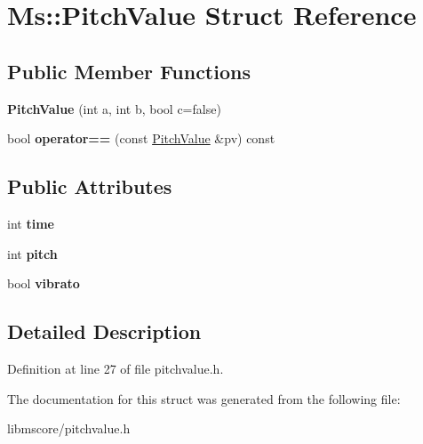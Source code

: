 \hypertarget{struct_ms_1_1_pitch_value}{}\section{Ms\+:\+:Pitch\+Value Struct Reference}
\label{struct_ms_1_1_pitch_value}
\subsection*{Public Member Functions}
\begin{DoxyCompactItemize}
\item 
\mbox{\label{struct_ms_1_1_pitch_value_ab09848a8add064a535915ea1447b5dd5}} 
{\bfseries Pitch\+Value} (int a, int b, bool c=false)
\item 
\mbox{\label{struct_ms_1_1_pitch_value_a43d9f0374b0fd435d8fb27c93ebc4eb7}} 
bool {\bfseries operator==} (const \hyperlink{struct_ms_1_1_pitch_value}{Pitch\+Value} \&pv) const
\end{DoxyCompactItemize}
\subsection*{Public Attributes}
\begin{DoxyCompactItemize}
\item 
\mbox{\label{struct_ms_1_1_pitch_value_add85dc057caf021cc8365b897a53d4be}} 
int {\bfseries time}
\item 
\mbox{\label{struct_ms_1_1_pitch_value_ad258c300e4aabf11d2b65502e6ce8376}} 
int {\bfseries pitch}
\item 
\mbox{\label{struct_ms_1_1_pitch_value_a7fd7bbfbf5c8145f75b2ccc6f34b14f5}} 
bool {\bfseries vibrato}
\end{DoxyCompactItemize}


\subsection{Detailed Description}


Definition at line 27 of file pitchvalue.\+h.



The documentation for this struct was generated from the following file\+:\begin{DoxyCompactItemize}
\item 
libmscore/pitchvalue.\+h\end{DoxyCompactItemize}
